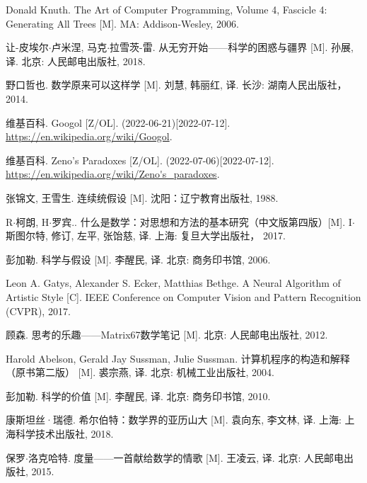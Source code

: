 \documentclass[UTF8]{article}
\begin{document}
\begin{thebibliography}{99}
Donald Knuth. The Art of Computer Programming, Volume 4, Fascicle 4: Generating All Trees [M]. MA: Addison-Wesley, 2006. %

让-皮埃尔$\cdot$卢米涅, 马克$\cdot$拉雪茨-雷. 从无穷开始——科学的困惑与疆界 [M]. 孙展, 译. 北京: 人民邮电出版社, 2018. %

野口哲也. 数学原来可以这样学 [M]. 刘慧, 韩丽红, 译. 长沙: 湖南人民出版社， 2014. %

维基百科. Googol [Z/OL]. (2022-06-21)[2022-07-12]. \url{https://en.wikipedia.org/wiki/Googol}.

维基百科. Zeno's Paradoxes [Z/OL]. (2022-07-06)[2022-07-12]. \url{https://en.wikipedia.org/wiki/Zeno's_paradoxes}.

张锦文, 王雪生. 连续统假设 [M]. 沈阳：辽宁教育出版社, 1988. %

R$\cdot$柯朗, H$\cdot$罗宾.. 什么是数学：对思想和方法的基本研究（中文版第四版）[M]. I$\cdot$斯图尔特, 修订, 左平, 张饴慈, 译. 上海: 复旦大学出版社， 2017. %


彭加勒. 科学与假设 [M]. 李醒民, 译. 北京: 商务印书馆, 2006. %

Leon A. Gatys, Alexander S. Ecker, Matthias Bethge. A Neural Algorithm of Artistic Style [C]. IEEE Conference on Computer Vision and Pattern Recognition (CVPR), 2017.

顾森. 思考的乐趣——Matrix67数学笔记 [M]. 北京: 人民邮电出版社, 2012. %

Harold Abelson, Gerald Jay Sussman, Julie Sussman. 计算机程序的构造和解释（原书第二版） [M]. 裘宗燕, 译. 北京: 机械工业出版社, 2004. %

彭加勒. 科学的价值 [M]. 李醒民, 译. 北京: 商务印书馆, 2010. %

康斯坦丝·瑞德. 希尔伯特：数学界的亚历山大 [M]. 袁向东, 李文林, 译. 上海: 上海科学技术出版社, 2018. %


保罗$\cdot$洛克哈特. 度量——一首献给数学的情歌 [M]. 王凌云, 译. 北京: 人民邮电出版社, 2015. %

\end{thebibliography}

\ifx\wholebook\relax \else

\expandafter\enddocument

\fi
\end{document}
